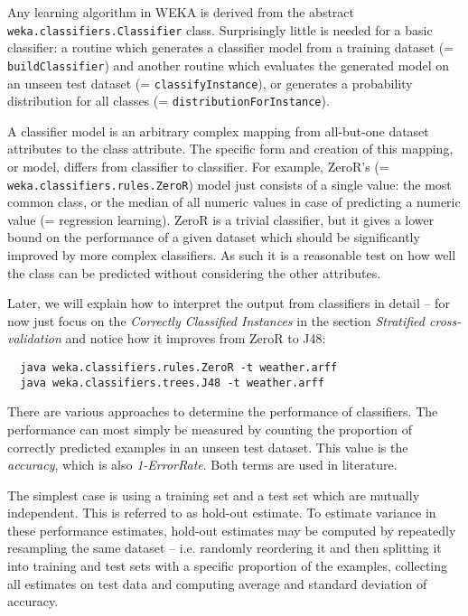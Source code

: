 Any learning algorithm in WEKA is derived from the abstract \texttt{weka.classifiers.Classifier} class. Surprisingly little is needed for a basic classifier: a routine which generates a classifier model from a training dataset (= \texttt{buildClassifier}) and another routine which evaluates the generated model on an unseen test dataset (= \texttt{classifyInstance}), or generates a probability distribution for all classes (= \texttt{distributionForInstance}).

A classifier model is an arbitrary complex mapping from all-but-one dataset attributes to the class attribute. The specific form and creation of this mapping, or model, differs from classifier to classifier. For example, ZeroR's (= \texttt{weka.classifiers.rules.ZeroR}) model just consists of a single value: the most common class, or the median of all numeric values in case of predicting a numeric value (= regression learning). ZeroR is a trivial classifier, but it gives a lower bound on the performance of a given dataset which should be significantly improved by more complex classifiers. As such it is a reasonable test on how well the class can be predicted without considering the other attributes.

Later, we will explain how to interpret the output from classifiers in detail -- for now just focus on the \textit{Correctly Classified Instances} in the section \textit{Stratified cross-validation} and notice how it improves from ZeroR to J48:

{\scriptsize
\begin{verbatim}
  java weka.classifiers.rules.ZeroR -t weather.arff
  java weka.classifiers.trees.J48 -t weather.arff
\end{verbatim}}

\noindent There are various approaches to determine the performance of classifiers. The performance can most simply be measured by counting the proportion of correctly predicted examples in an unseen test dataset. This value is the \textit{accuracy}, which is also \textit{1-ErrorRate}. Both terms are used in literature.

The simplest case is using a training set and a test set which are mutually independent. This is referred to as hold-out estimate. To estimate variance in these performance estimates, hold-out estimates may be computed by repeatedly resampling the same dataset -- i.e. randomly reordering it and then splitting it into training and test sets with a specific proportion of the examples, collecting all estimates on test data and computing average and standard deviation of accuracy.

